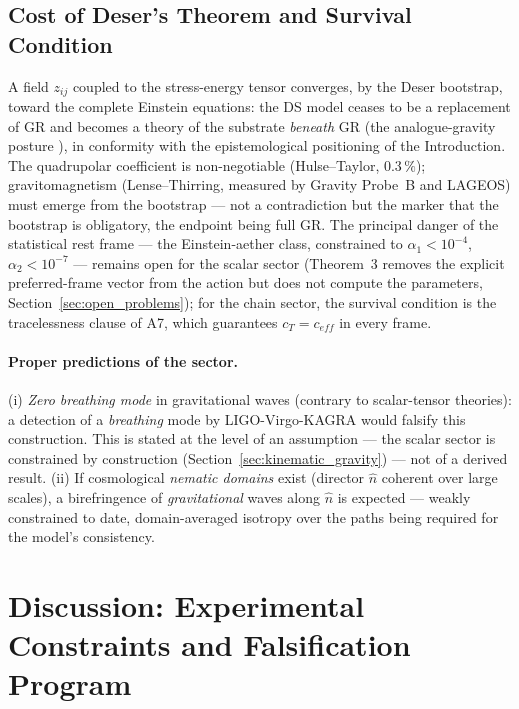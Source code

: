 \documentclass[11pt,a4paper]{article}
\theoremstyle{plain}
\theoremstyle{remark}
\begin{document}
\subsection{Cost of Deser's Theorem and Survival Condition}
A field $z_{ij}$ coupled to the stress-energy tensor converges, by the Deser bootstrap, toward the complete Einstein equations: the DS model ceases to be a replacement of GR and becomes a theory of the substrate \emph{beneath} GR (the analogue-gravity posture \cite{barcelo, volovik}), in conformity with the epistemological positioning of the Introduction. The quadrupolar coefficient is non-negotiable (Hulse--Taylor, $0.3\,\%$); gravitomagnetism (Lense--Thirring, measured by Gravity Probe~B and LAGEOS) must emerge from the bootstrap --- not a contradiction but the marker that the bootstrap is obligatory, the endpoint being full GR. The principal danger of the statistical rest frame --- the Einstein-aether class, constrained to $\alpha_1 < 10^{-4}$, $\alpha_2 < 10^{-7}$ \cite{jacobson_ae, will_ppn} --- remains open for the scalar sector (Theorem~3 removes the explicit preferred-frame vector from the action but does not compute the parameters, Section~\ref{sec:open_problems}); for the chain sector, the survival condition is the tracelessness clause of A7, which guarantees $c_T = c_{eff}$ in every frame.

\paragraph{Proper predictions of the sector.} (i) \emph{Zero breathing mode} in gravitational waves (contrary to scalar-tensor theories): a detection of a \emph{breathing} mode by LIGO-Virgo-KAGRA would falsify this construction. This is stated at the level of an assumption --- the scalar sector is constrained by construction (Section~\ref{sec:kinematic_gravity}) --- not of a derived result. (ii) If cosmological \emph{nematic domains} exist (director $\hat{n}$ coherent over large scales), a birefringence of \emph{gravitational} waves along $\hat{n}$ is expected --- weakly constrained to date, domain-averaged isotropy over the paths being required for the model's consistency.

\section{Discussion: Experimental Constraints and Falsification Program}
\label{sec:discussion}
\end{document}
